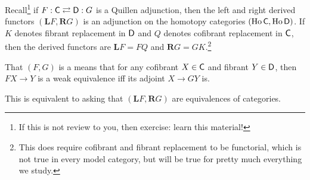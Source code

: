 Recall\footnote{If this is not review to you, then exercise: learn this material!} if $F: \mathsf C\rightleftarrows \mathsf D:
G$ is a Quillen adjunction, then the left and right derived functors $(\mathbf LF, \mathbf RG)$ is an adjunction on
the homotopy categories $(\operatorname{Ho}\mathsf C, \operatorname{Ho}\mathsf D)$. If $K$ denotes fibrant replacement in $\mathsf D$
and $Q$ denotes cofibrant replacement in $\mathsf C$, then the derived functors are $\mathbf LF = FQ$ and $\mathbf RG =
GK$.\footnote{This does require cofibrant and fibrant replacement to be functorial, which is not true in every
model category, but will be true for pretty much everything we study.}
\begin{defn}
That $(F, G)$ is a  means that for any cofibrant $X\in\mathsf C$ and fibrant $Y\in\mathsf D$, then
$FX\to Y$ is a weak equivalence iff its adjoint $X\to GY$ is.
\end{defn}
This is equivalent to asking that $(\mathbf LF, \mathbf RG)$ are equivalences of categories.


